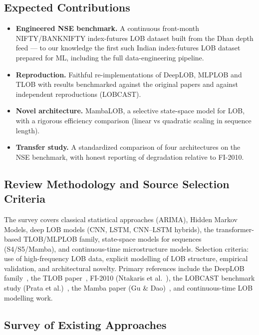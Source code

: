 \documentclass[11pt]{article}
\begin{document}
\subsection{Expected Contributions}
\begin{itemize}[nosep]
  \item \textbf{Engineered NSE benchmark.} A continuous front-month NIFTY/BANKNIFTY index-futures LOB
        dataset built from the Dhan depth feed --- to our knowledge the first such Indian index-futures LOB
        dataset prepared for ML, including the full data-engineering pipeline.
  \item \textbf{Reproduction.} Faithful re-implementations of DeepLOB, MLPLOB and TLOB with results
        benchmarked against the original papers and against independent reproductions (LOBCAST).
  \item \textbf{Novel architecture.} MambaLOB, a selective state-space model for LOB, with a rigorous
        efficiency comparison (linear vs quadratic scaling in sequence length).
  \item \textbf{Transfer study.} A standardized comparison of four architectures on the NSE benchmark, with
        honest reporting of degradation relative to FI-2010.
\end{itemize}

\subsection{Review Methodology and Source Selection Criteria}
The survey covers classical statistical approaches (ARIMA), Hidden Markov Models, deep LOB models
(CNN, LSTM, CNN--LSTM hybrids), the transformer-based TLOB/MLPLOB family, state-space models for sequences
(S4/S5/Mamba), and continuous-time microstructure models. Selection criteria: use of high-frequency LOB
data, explicit modelling of LOB structure, empirical validation, and architectural novelty. Primary
references include the DeepLOB family~\cite{deeplob}, the TLOB paper~\cite{tlob}, FI-2010 (Ntakaris et al.~\cite{fi2010}), the LOBCAST benchmark
study (Prata et al.)~\cite{lobcast}, the Mamba paper (Gu \& Dao)~\cite{mamba}, and continuous-time LOB modelling work.

\subsection{Survey of Existing Approaches}
\end{document}
